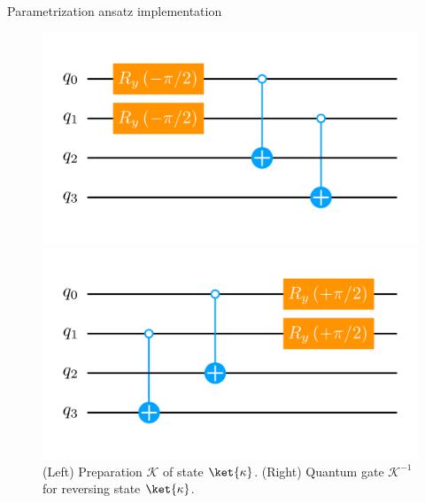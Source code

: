 \begin{frame}[allowframebreaks]{Parametrization ansatz implementation}
	\begin{figure}[!p]
		\centering
		\begin{minipage}[c]{.45\linewidth}
			\centering
			\includegraphics[width=\linewidth]{Figures/NJL1-model-solving/ansatz-implementation-base-state-preparation-kappa}
		\end{minipage}
	  \hspace{.025\linewidth}
		\begin{minipage}[c]{.45\linewidth}
			\centering
			\includegraphics[width=\linewidth]{Figures/NJL1-model-solving/ansatz-implementation-base-state-reversing-kappa}
		\end{minipage}
		\caption{(Left) Preparation $\mathcal{K}$ of state $\ket{\kappa}$. (Right) Quantum gate $\mathcal{K}^{-1}$ for reversing state $\ket{\kappa}$.}
	\end{figure}

\break

	\begin{multicols}{2}


\end{multicols}
\end{frame}
